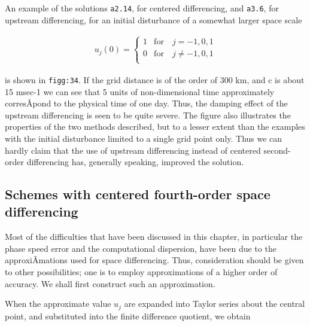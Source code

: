 An example of the solutions \texttt{a2.14}, for centered differencing,
and \texttt{a3.6}, for upstream differencing, for an initial disturbance
of a somewhat larger space scale

\[\begin{aligned}
u_{j}(0) = \left\{ \begin{array}{cc}
1  &\textrm{for} \quad j = -1,0,1\\
0  &\textrm{for} \quad j \neq -1,0,1\\
\end{array} \right.
\end{aligned}\]

is shown in \texttt{figg:34}. If the grid distance is of the order of
300 km, and c is about 15 msec-1 we can see that 5 units of
non-dimensional time approximately corresÂ­pond to the physical time of
one day. Thus, the damping effect of the upstream differencing is seen
to be quite severe. The figure also illustrates the properties of the
two methods described, but to a lesser extent than the examples with the
initial disturbance limited to a single grid point only. Thus we can
hardly claim that the use of upstream differencing instead of centered
second-order differencing has, generally speaking, improved the
solution.

\begin{figure}
\centering
{}
\caption{}
\end{figure}

\subsection{\texorpdfstring{\textbf{Schemes with centered fourth-order
space
differencing}}{Schemes with centered fourth-order space differencing}}\label{schemes-with-centered-fourth-order-space-differencing}

Most of the difficulties that have been discussed in this chapter, in
particular the phase speed error and the computational dispersion, have
been due to the approxiÂ­mations used for space differencing. Thus,
consideration should be given to other possibilities; one is to employ
approximations of a higher order of accuracy. We shall first construct
such an approximation.

When the approximate value \(u_{j}\) are expanded into Taylor series
about the central point, and substituted into the finite difference
quotient, we obtain

